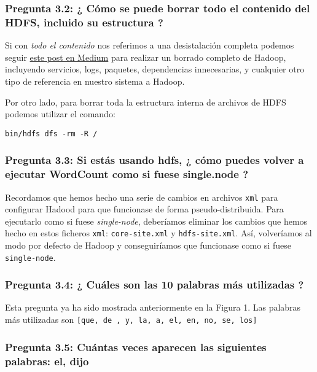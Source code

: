 \documentclass[11pt]{article}
\def\inline{\lstinline[basicstyle=\ttfamily,keywordstyle={}]}
\begin{document}
\subsubsection*{ Pregunta 3.2: ¿ Cómo se puede borrar todo el contenido del HDFS, incluido su estructura ?}

Si con \emph{todo el contenido} nos referimos a una desistalación completa podemos seguir \href{https://medium.com/@deepeshtripathi/completely-uninstall-and-delete-hadoop-from-hosts-hortonworks-1a3f755afa20}{este post en Medium} para realizar un borrado completo de Hadoop, incluyendo servicios, logs, paquetes, dependencias innecesarias, y cualquier otro tipo de referencia en nuestro sistema a Hadoop.

Por otro lado, para borrar toda la estructura interna de archivos de HDFS podemos utilizar el comando:

\begin{verbatim}
bin/hdfs dfs -rm -R /
\end{verbatim}

\subsubsection*{ Pregunta 3.3: Si estás usando hdfs, ¿ cómo puedes volver a ejecutar WordCount como si fuese single.node ? }

Recordamos que hemos hecho una serie de cambios en archivos \inline{xml} para configurar Hadood para que funcionase de forma pseudo-distribuida. Para ejecutarlo como si fuese \emph{single-node}, deberíamos eliminar los cambios que hemos hecho en estos ficheros \inline{xml}: \inline{core-site.xml} y \inline{hdfs-site.xml}. Así, volveríamos al modo por defecto de Hadoop y conseguiríamos que funcionase como si fuese \inline{single-node}.

\subsubsection*{ Pregunta 3.4: ¿ Cuáles son las 10 palabras más utilizadas ? }

Esta pregunta ya ha sido mostrada anteriormente en la Figura 1. Las palabras más utilizadas son \inline{[que, de , y, la, a, el, en, no, se, los]}

\subsubsection*{ Pregunta 3.5: Cuántas veces aparecen las siguientes palabras: el, dijo }
\end{document}
